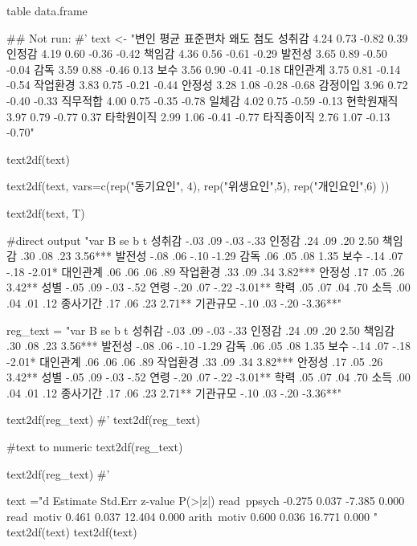 \documentclass[a4paper]{book}
\begin{document}
%
\begin{Value}
table data.frame
\end{Value}
%
\begin{Examples}
\begin{ExampleCode}

\#\# Not run: 
#'
text <- "변인 평균 표준편차 왜도 첨도
성취감 4.24 0.73 -0.82 0.39
인정감 4.19 0.60 -0.36 -0.42
책임감 4.36 0.56 -0.61 -0.29
발전성 3.65 0.89 -0.50 -0.04
감독 3.59 0.88 -0.46 0.13
보수 3.56 0.90 -0.41 -0.18
대인관계 3.75 0.81 -0.14 -0.54
작업환경 3.83 0.75 -0.21 -0.44
안정성 3.28 1.08 -0.28 -0.68
감정이입 3.96 0.72 -0.40 -0.33
직무적합 4.00 0.75 -0.35 -0.78
일체감 4.02 0.75 -0.59 -0.13
현학원재직 3.97 0.79 -0.77 0.37
타학원이직 2.99 1.06 -0.41 -0.77
타직종이직 2.76 1.07 -0.13 -0.70"

text2df(text)

text2df(text, vars=c(rep("동기요인", 4), rep("위생요인",5), rep("개인요인",6)  ))

text2df(text, T)%

#direct output
"var B se b t
성취감 -.03 .09 -.03 -.33
인정감 .24 .09 .20 2.50
책임감 .30 .08 .23 3.56***
발전성 -.08 .06 -.10 -1.29
감독 .06 .05 .08 1.35
보수 -.14 .07 -.18 -2.01*
대인관계 .06 .06 .06 .89
작업환경 .33 .09 .34 3.82***
안정성 .17 .05 .26 3.42**
성별 -.05 .09 -.03 -.52
연령 -.20 .07 -.22 -3.01**
학력 .05 .07 .04 .70
소득 .00 .04 .01 .12
종사기간 .17 .06 .23 2.71**
기관규모 -.10 .03 -.20 -3.36**" %

reg_text = "var B se b t
성취감 -.03 .09 -.03 -.33
인정감 .24 .09 .20 2.50
책임감 .30 .08 .23 3.56***
발전성 -.08 .06 -.10 -1.29
감독 .06 .05 .08 1.35
보수 -.14 .07 -.18 -2.01*
대인관계 .06 .06 .06 .89
작업환경 .33 .09 .34 3.82***
안정성 .17 .05 .26 3.42**
성별 -.05 .09 -.03 -.52
연령 -.20 .07 -.22 -3.01**
학력 .05 .07 .04 .70
소득 .00 .04 .01 .12
종사기간 .17 .06 .23 2.71**
기관규모 -.10 .03 -.20 -3.36**"

text2df(reg_text)
#'
text2df(reg_text) %

#text to numeric
text2df(reg_text)%

text2df(reg_text)%
#'

text ="d           Estimate  Std.Err  z-value  P(>|z|)
  read~ppsych           -0.275    0.037   -7.385    0.000
    read~motiv             0.461    0.037   12.404    0.000
arith~motiv             0.600    0.036   16.771    0.000
"
text2df(text)
text2df(text) %


\end{ExampleCode}
\end{Examples}
\end{document}
